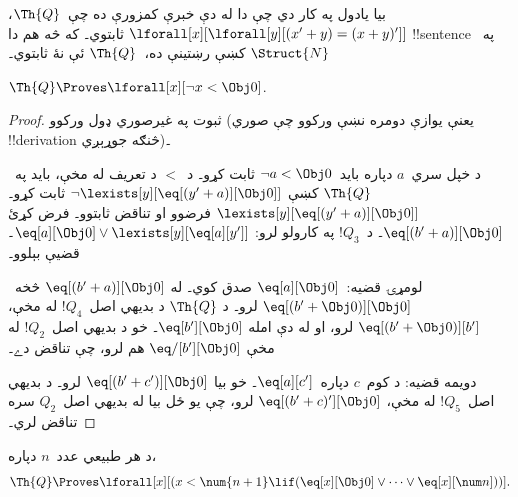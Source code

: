 \documentclass[../../../include/open-logic-section]{subfiles}
\begin{document}
بيا يادول په کار دي چې دا له دې خبرې کمزورې ده چې~$\Th{Q}$،
$\lforall[x][\lforall[y][(x' + y) = (x + y)']]$ ثابتوي۔ که څه هم
دا !!{sentence} په~$\Struct{N}$ کښې رښتينې ده،~$\Th{Q}$ ئې نۀ
ثابتوي۔

\begin{lem}
$\Th{Q} \Proves \lforall[x][\lnot x < \Obj 0]$.
\end{lem}

\begin{proof}
ثبوت په غيرصوري ډول ورکوو (يعنې يوازې دومره نښې ورکوو چې صوري
!!{derivation} څنګه جوړېږي)۔

د خپل سري~$a$ دپاره بايد~$\lnot a < \Obj 0$ ثابت کړو۔ د~$<$ د
تعريف له مخې، بايد په~$\Th{Q}$ کښې
$\lnot \lexists[y][\eq[(y'+a)][\Obj 0]]$ ثابت کړو۔
$\lexists[y][\eq[(y'+a)][\Obj 0]]$ فرضوو او تناقض ثابتوو۔ فرض کړئ
$\eq[(b'+a)][\Obj 0]$۔ د~$!Q_3$ په کارولو لرو:
$\eq[a][\Obj 0] \lor \lexists[y][\eq[a][y']]$۔ قضيې بېلوو۔

لومړۍ قضيه:~$\eq[a][\Obj 0]$ صدق کوي۔ له
$\eq[(b'+a)][\Obj 0]$ څخه~$\eq[(b' + \Obj 0)][\Obj 0]$ لرو۔ د
$\Th{Q}$ د بديهي اصل~$!Q_4$ له مخې،
$\eq[(b' + \Obj 0)][b']$ لرو، او له دې امله
$\eq[b'][\Obj 0]$۔ خو د بديهي اصل~$!Q_2$ له مخې
$\eq/[b'][\Obj 0]$ هم لرو، چې تناقض دے۔

دويمه قضيه: د کوم~$c$ دپاره~$\eq[a][c']$۔ خو بيا
$\eq[(b' + c')][\Obj 0]$ لرو۔ د بديهي اصل~$!Q_5$ له مخې،
$\eq[(b' + c)'][\Obj 0]$ لرو، چې يو ځل بيا له بديهي اصل~$Q_2$ سره
تناقض لري۔
\end{proof}

\begin{lem}
د هر طبيعي عدد~$n$ دپاره،
  \[
  \Th{Q} \Proves
  \lforall[x][(x < \num {n+1} \lif (\eq[x][\Obj 0] \lor \dots \lor
    \eq[x][\num n]))].
  \]
\end{lem}
\end{document}
